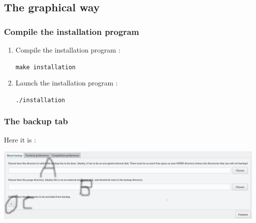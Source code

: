 \documentclass[a4paper,12pt]{article}
\newcommand{\info}[1]{\texttt{#1}}
\begin{document}
\subsection{The graphical way}

\subsubsection{Compile the installation program}

\begin{enumerate}
    \item
        Compile the installation program :
        \begin{center}
            \info{make installation}
        \end{center}
    \item
        Launch the installation program :
        \begin{center}
            \info{./installation}
        \end{center}
\end{enumerate}

\subsubsection{The backup tab}

Here it is :

\begin{center}
    \includegraphics[width=\linewidth]{backup_tab.png}
\end{center}
\end{document}
